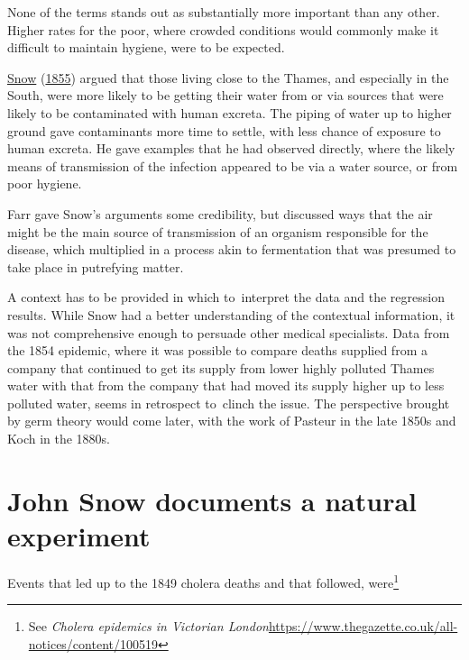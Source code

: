 \documentclass[
  10pt,
  b5paper]{book}
\begin{document}
None of the terms stands out as substantially more important
than any other. Higher rates for the poor, where crowded
conditions would commonly make it difficult to maintain hygiene,
were to be expected.

\protect\hyperlink{ref-snow1849mode}{Snow} (\protect\hyperlink{ref-snow1849mode}{1855}) argued that those living
close to the Thames, and especially in the South, were
more likely to be getting their water from or via sources
that were likely to be contaminated with human excreta. The
piping of water up to higher ground gave contaminants
more time to settle, with less chance of exposure to human
excreta. He gave examples that he had observed directly,
where the likely means of transmission of the infection
appeared to be via a water source, or from poor hygiene.

Farr gave Snow's arguments some credibility, but discussed
ways that the air might be the main source of transmission
of an organism responsible for the disease, which multiplied
in a process akin to fermentation that was presumed to take
place in putrefying matter.

A context has to be provided in which to~interpret the data
and the regression results. While Snow had a better understanding
of the contextual information, it was not comprehensive
enough to persuade other medical specialists. Data from the
1854 epidemic, where it was possible to compare deaths supplied
from a company that continued to get its supply from lower
highly polluted Thames water with that from the company that
had moved its supply higher up to less polluted water, seems
in retrospect to~clinch the issue. The perspective brought by
germ theory would come later, with the work of Pasteur in the
late 1850s and Koch in the 1880s.

\hypertarget{john-snow-documents-a-natural-experiment}{%
\section{John Snow documents a natural experiment}\label{john-snow-documents-a-natural-experiment}}

Events that led up to the 1849 cholera deaths and that followed,
were\footnote{See \emph{Cholera epidemics in Victorian London}\newline \url{https://www.thegazette.co.uk/all-notices/content/100519}}
\end{document}
